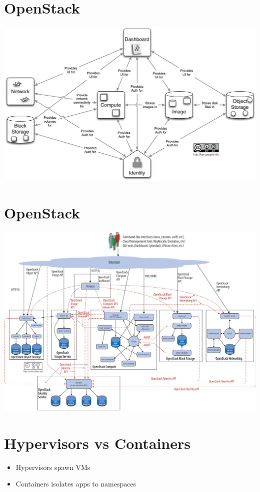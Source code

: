 \documentclass[11pt]{article}
\begin{document}
\section*{OpenStack}
\label{sec:orgd232c4e}
\begin{center}
\includegraphics[width=.9\linewidth]{./openstack.jpg}
\end{center}

\section*{OpenStack}
\label{sec:org785e0a7}
\begin{center}
\includegraphics[width=.9\linewidth]{./openstack-detailed.png}
\end{center}

\section*{Hypervisors vs Containers}
\label{sec:org1e90bf7}
\begin{itemize}
\item Hypervisors spawn VMs
\item Containers isolates apps to namespaces
\end{itemize}
\end{document}
